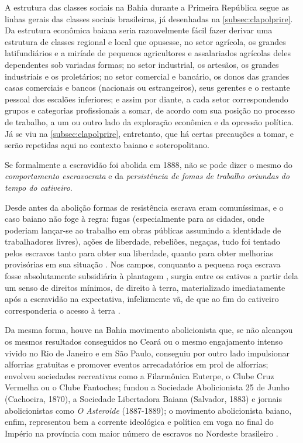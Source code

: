 A estrutura das classes sociais na Bahia durante a Primeira República segue as linhas gerais das classes sociais brasileiras, já desenhadas na \autoref{subsec:clapolprire}. Da estrutura econômica baiana seria razoavelmente fácil fazer derivar uma estrutura de classes regional e local que opusesse, no setor agrícola, os grandes latifundiários e a miríade de pequenos agricultores e assalariados agrícolas deles dependentes sob variadas formas; no setor industrial, os artesãos, os grandes industriais e os proletários; no setor comercial e bancário, os donos das grandes casas comerciais e bancos (nacionais ou estrangeiros), seus gerentes e o restante pessoal dos escalões inferiores; e assim por diante, a cada setor correspondendo grupos e categorias profissionais a somar, de acordo com sua posição no processo de trabalho, a um ou outro lado da exploração econômica e da opressão política. Já se viu na \autoref{subsec:clapolprire}, entretanto, que há certas precauções a tomar, e serão repetidas aqui no contexto baiano e soteropolitano.

Se formalmente a escravidão foi abolida em 1888, não se pode dizer o mesmo do \textit{comportamento escravocrata} e da \textit{persistência de fomas de trabalho oriundas do tempo do cativeiro}. 

Desde antes da abolição formas de resistência escrava eram comuníssimas, e o caso baiano não foge à regra: fugas (especialmente para as cidades, onde poderiam lançar-se ao trabalho em obras públicas assumindo a identidade de trabalhadores livres), ações de liberdade, rebeliões, negaças, tudo foi tentado pelos escravos tanto para obter sua liberdade, quanto para obter melhorias provisórias em sua situação \cite[p.~45-52]{fraga_encruzilhadas_2014}. Nos campos, conquanto a pequena roça escrava fosse absolutamente subsidiária à plantagem \cite{gorender_escracolo_2010}, surgia entre os cativos a partir dela um senso de direitos mínimos, de direito à terra, materializado imediatamente após a escravidão na expectativa, infelizmente vã, de que ao fim do cativeiro corresponderia o acesso à terra \cite{fraga_encruzilhadas_2014}.

Da mesma forma, houve na Bahia movimento abolicionista que, se não alcançou os mesmos resultados conseguidos no Ceará ou o mesmo engajamento intenso vivido no Rio de Janeiro e em São Paulo, conseguiu por outro lado impulsionar alforrias gratuitas e promover eventos arrecadatórios em prol de alforrias; envolveu sociedades recreativas como a Filarmônica Euterpe, o Clube Cruz Vermelha ou o Clube Fantoches; fundou a Sociedade Abolicionista 25 de Junho (Cachoeira, 1870), a Sociedade Libertadora Baiana (Salvador, 1883) e jornais abolicionistas como \textit{O Asteroide} (1887-1889); o movimento abolicionista baiano, enfim, representou bem a corrente ideológica e política em voga no final do Império na província com maior número de escravos no Nordeste brasileiro \cite{brito2003abolicao}.


